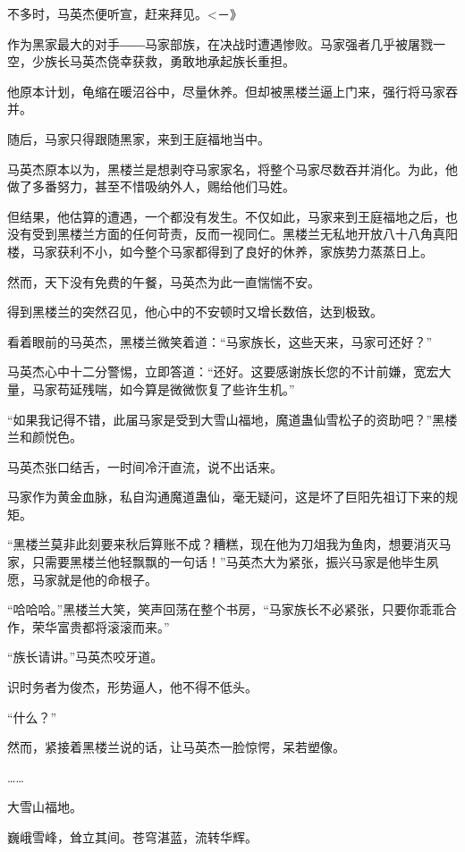 
\begin{this_body}

不多时，马英杰便听宣，赶来拜见。<－》

作为黑家最大的对手――马家部族，在决战时遭遇惨败。马家强者几乎被屠戮一空，少族长马英杰侥幸获救，勇敢地承起族长重担。

他原本计划，龟缩在暖沼谷中，尽量休养。但却被黑楼兰逼上门来，强行将马家吞并。

随后，马家只得跟随黑家，来到王庭福地当中。

马英杰原本以为，黑楼兰是想剥夺马家家名，将整个马家尽数吞并消化。为此，他做了多番努力，甚至不惜吸纳外人，赐给他们马姓。

但结果，他估算的遭遇，一个都没有发生。不仅如此，马家来到王庭福地之后，也没有受到黑楼兰方面的任何苛责，反而一视同仁。黑楼兰无私地开放八十八角真阳楼，马家获利不小，如今整个马家都得到了良好的休养，家族势力蒸蒸日上。

然而，天下没有免费的午餐，马英杰为此一直惴惴不安。

得到黑楼兰的突然召见，他心中的不安顿时又增长数倍，达到极致。

看着眼前的马英杰，黑楼兰微笑着道：“马家族长，这些天来，马家可还好？”

马英杰心中十二分警惕，立即答道：“还好。这要感谢族长您的不计前嫌，宽宏大量，马家苟延残喘，如今算是微微恢复了些许生机。”

“如果我记得不错，此届马家是受到大雪山福地，魔道蛊仙雪松子的资助吧？”黑楼兰和颜悦色。

马英杰张口结舌，一时间冷汗直流，说不出话来。

马家作为黄金血脉，私自沟通魔道蛊仙，毫无疑问，这是坏了巨阳先祖订下来的规矩。

“黑楼兰莫非此刻要来秋后算账不成？糟糕，现在他为刀俎我为鱼肉，想要消灭马家，只需要黑楼兰他轻飘飘的一句话！”马英杰大为紧张，振兴马家是他毕生夙愿，马家就是他的命根子。

“哈哈哈。”黑楼兰大笑，笑声回荡在整个书房，“马家族长不必紧张，只要你乖乖合作，荣华富贵都将滚滚而来。”

“族长请讲。”马英杰咬牙道。

识时务者为俊杰，形势逼人，他不得不低头。

“什么？”

然而，紧接着黑楼兰说的话，让马英杰一脸惊愕，呆若塑像。

……

大雪山福地。

巍峨雪峰，耸立其间。苍穹湛蓝，流转华辉。


\end{this_body}
